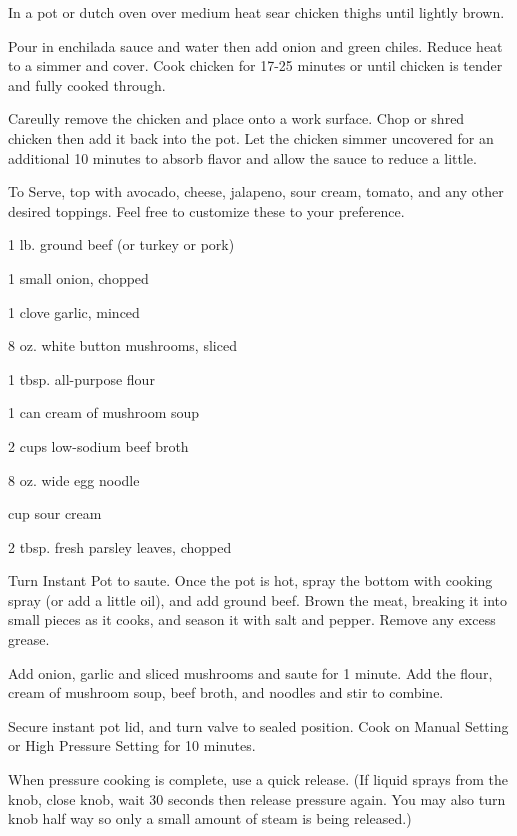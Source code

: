 \documentclass{cookbook}
\begin{document}
In a pot or dutch oven over medium heat sear chicken thighs until lightly brown.

Pour in enchilada sauce and water then add onion and green chiles. Reduce heat to a simmer and cover. Cook chicken for 17-25 minutes or until chicken is tender and fully cooked through.

Careully remove the chicken and place onto a work surface. Chop or shred chicken then add it back into the pot. Let the chicken simmer uncovered for an additional 10 minutes to absorb flavor and allow the sauce to reduce a little.

To Serve, top with avocado, cheese, jalapeno, sour cream, tomato, and any other desired toppings. Feel free to customize these to your preference.


\begin{ingredients}
    \item 1 lb. ground beef (or turkey or pork)
    \item 1 small onion, chopped
    \item 1 clove garlic, minced
    \item 8 oz. white button mushrooms, sliced
    \item 1 tbsp. all-purpose flour
    \item 1 can cream of mushroom soup
    \item 2  cups low-sodium beef broth
    \item 8 oz. wide egg noodle
    \item {} cup sour cream
    \item 2 tbsp. fresh parsley leaves, chopped
\end{ingredients}

Turn Instant Pot to saute. Once the pot is hot, spray the bottom with cooking spray (or add a little oil), and add ground beef. Brown the meat, breaking it into small pieces as it cooks, and season it with salt and pepper. Remove any excess grease.

Add onion, garlic and sliced mushrooms and saute for 1 minute. Add the flour, cream of mushroom soup, beef broth, and noodles and stir to combine.

Secure instant pot lid, and turn valve to sealed position. Cook on Manual Setting or High Pressure Setting for 10 minutes.

When pressure cooking is complete, use a quick release. (If liquid sprays from the knob, close knob, wait 30 seconds then release pressure again. You may also turn knob half way so only a small amount of steam is being released.)
\end{document}

